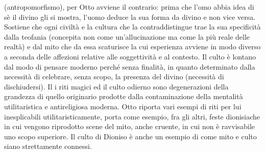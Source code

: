 \documentclass[10pt,a4paper]{article}
\begin{document}
(antropomorfismo), per Otto avviene il contrario: prima che l'omo abbia idea di sè il divino gli si mostra, l'uomo deduce la sua forma da divino e non vice versa. Sostiene che ogni civiltà e la cultura che la contraddistingue trae la sua specificità dalla teofania (concepita non come un'allucinazione ma come la più reale delle realtà) e dal mito che da essa scaturisce la cui esperienza avviene in modo diverso a seconda delle affezioni relative alle soggettività e al contesto. Il culto è lontano dal modo di pensare moderno perché senza finalità, in quanto determinato dalla necessità di celebrare, senza scopo, la presenza del divino (necessità di dischiudersi). Il i riti magici ed il culto odierno sono degenerazioni della grandezza di quello originario prodotte dalla contaminazione della mentalità utilitaristica e antireligiosa moderna. Otto riporta vari esempi di riti per lui inesplicabili utilitaristicamente, porta come esempio, fra gli altri, feste dionisiache in cui vengono riprodotto scene del mito, anche cruente, in cui non è ravvisabile uno scopo superiore. Il culto di Dioniso è anche un esempio di come mito e culto siano strettamente connessi. 
\end{document}
